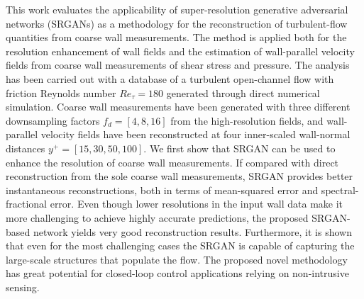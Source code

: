 {%
This work evaluates the applicability of super-resolution generative adversarial networks (SRGANs) as a methodology for the reconstruction of turbulent-flow quantities from coarse wall measurements.
The method is applied both for the resolution enhancement of wall fields and the estimation of wall-parallel velocity fields from coarse wall measurements of shear stress and pressure.
The analysis has been carried out with a database of a turbulent open-channel flow with friction Reynolds number $Re_{\tau}=180$ generated through direct numerical simulation.
Coarse wall measurements have been generated with three different downsampling factors $f_d=[4,8,16]$ from the high-resolution fields, and wall-parallel velocity fields have been reconstructed at four inner-scaled wall-normal distances $y^+=[15,30,50,100]$.
We first show that SRGAN can be used to enhance the resolution of coarse wall measurements.
If compared with direct reconstruction from the sole coarse wall measurements, SRGAN provides better instantaneous reconstructions, both in terms of mean-squared error and spectral-fractional error.
Even though lower resolutions in the input wall data make it more challenging to achieve highly accurate predictions, the proposed SRGAN-based network yields very good reconstruction results.
Furthermore, it is shown that even for the most challenging cases the SRGAN is capable of capturing the large-scale structures that populate the flow.
The proposed novel methodology has great potential for closed-loop control applications relying on non-intrusive sensing.
}%
%
\graphicspath{{paper3/}}%
%
%
%
